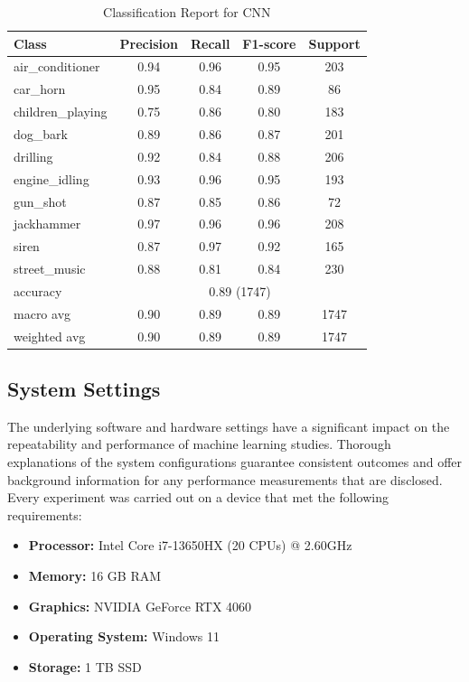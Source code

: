 \documentclass[conference]{IEEEtran}
\begin{document}
\begin{table}[ht]
    \centering
    \begin{tabular}{lcccc}
        \hline
        Class & Precision & Recall & F1-score & Support \\
        \hline
        air\_conditioner & 0.94 & 0.96 & 0.95 & 203 \\
        car\_horn & 0.95 & 0.84 & 0.89 & 86 \\
        children\_playing & 0.75 & 0.86 & 0.80 & 183 \\
        dog\_bark & 0.89 & 0.86 & 0.87  & 201 \\
        drilling & 0.92 & 0.84 & 0.88 & 206 \\
        engine\_idling & 0.93 & 0.96 & 0.95 & 193 \\
        gun\_shot & 0.87 & 0.85 & 0.86 & 72 \\
        jackhammer & 0.97 & 0.96 & 0.96 & 208 \\
        siren & 0.87 & 0.97 & 0.92 & 165 \\
        street\_music & 0.88 & 0.81 & 0.84 & 230 \\
        \hline
        accuracy & \multicolumn{4}{c}{0.89 (1747)} \\
        macro avg & 0.90 & 0.89 & 0.89 & 1747 \\
        weighted avg & 0.90 & 0.89 & 0.89 & 1747 \\
        \hline
    \end{tabular}
        \caption{Classification Report for CNN}
    \label{tab:classification_repor}
\end{table}



\subsection{System Settings}
The underlying software and hardware settings have a significant impact on the repeatability and performance of machine learning studies. Thorough explanations of the system configurations guarantee consistent outcomes and offer background information for any performance measurements that are disclosed. Every experiment was carried out on a device that met the following requirements:

\begin{itemize}
    \item \textbf{Processor:} Intel Core i7-13650HX (20 CPUs) @ 2.60GHz
    \item \textbf{Memory:} 16 GB RAM
    \item \textbf{Graphics:} NVIDIA GeForce RTX 4060
    \item \textbf{Operating System:} Windows 11
    \item \textbf{Storage:} 1 TB SSD
\end{itemize}
\end{document}
